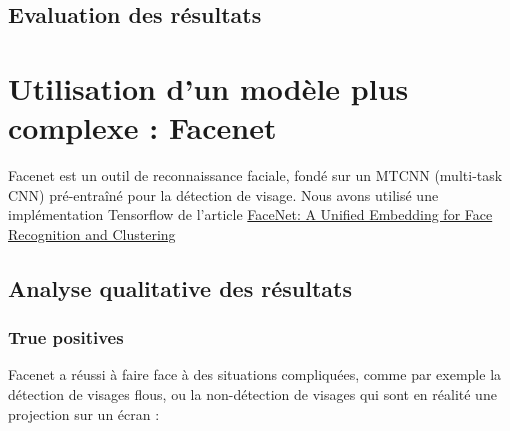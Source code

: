 \documentclass[a4paper,11pt]{article}
\begin{document}
\subsection{Evaluation des résultats}

\section{Utilisation d'un modèle plus complexe : Facenet}

Facenet est un outil de reconnaissance faciale, fondé sur un MTCNN (multi-task CNN) pré-entraîné pour la détection de visage. Nous avons utilisé une implémentation Tensorflow de l'article \href{https://arxiv.org/abs/1503.03832}{FaceNet: A Unified Embedding for Face Recognition and Clustering}

\subsection{Analyse qualitative des résultats}
\subsubsection{True positives}

Facenet a réussi à faire face à des situations compliquées, comme par exemple la détection de visages flous, ou la non-détection de visages qui sont en réalité une projection sur un écran :\\
\end{document}
